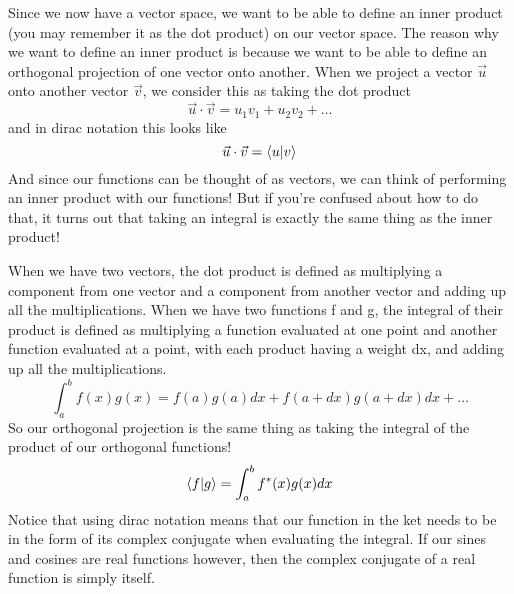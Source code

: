 \documentclass{article}
\newcommand{\be}{\begin{equation}}
\newcommand{\ee}{\end{equation}}
\begin{document}
Since we now have a vector space, we want to be able to define an inner product (you may remember it as the dot product) on our vector space.
The reason why we want to define an inner product is because we want to be able to define an orthogonal projection of one vector onto another.
When we project a vector $\vec{u}$ onto another vector $\vec{v}$, we consider this as taking the dot product
\be
  \vec{u} \cdot \vec{v} = u_1v_1 + u_2v_2 + \hdots
\ee
and in dirac notation this looks like
\be
  \vec{u} \cdot \vec{v} = \braket{u|v}
\ee
And since our functions can be thought of as vectors, we can think of performing an inner product with our functions!
But if you're confused about how to do that, it turns out that taking an integral is exactly the same thing as the inner product!

When we have two vectors, the dot product is defined as multiplying a component from one vector and a component from another vector and adding up all the multiplications.
When we have two functions f and g, the integral of their product is defined as multiplying a function evaluated at one point and another function evaluated at a point, with each product having a weight dx, and adding up all the multiplications.
\be
  \int_a^b f(x)g(x) = f(a)g(a)dx + f(a + dx)g(a + dx)dx + \hdots
\ee
So our orthogonal projection is the same thing as taking the integral of the product of our orthogonal functions!
\be
  \braket{f|g} = \int_a^b f^*(x)g(x) dx
\ee
Notice that using dirac notation means that our function in the ket needs to be in the form of its complex conjugate when evaluating the integral.
If our sines and cosines are real functions however, then the complex conjugate of a real function is simply itself.
\end{document}
